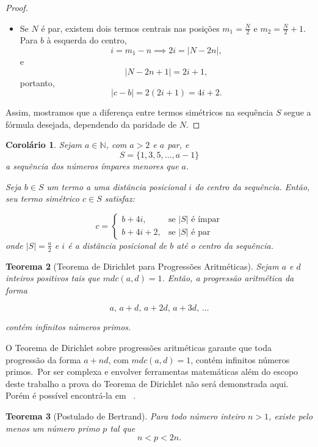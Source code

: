 \documentclass[a4paper,11pt]{article}
\newtheorem{theorem}{Teorema}[section]
\newtheorem{corollary}[theorem]{Corolário}
\theoremstyle{definition}
\theoremstyle{remark}
\begin{document}
\begin{otherlanguage}{brazil}
\begin{proof}
\begin{itemize}
			\item Se $N$ é par, existem dois termos centrais nas posições $m_1 = \frac{N}{2}$ e $m_2 = \frac{N}{2} + 1$. Para $b$ à esquerda do centro,
			\[
			i = m_1 - n \implies 2i = |N - 2n|,
			\]
			e
			\[
			|N - 2n + 1| = 2i + 1,
			\]
			portanto,
			\[
			|c - b| = 2(2i + 1) = 4i + 2.
			\]
		\end{itemize}
		
		Assim, mostramos que a diferença entre termos simétricos na sequência $S$ segue a fórmula desejada, dependendo da paridade de $N$.
		
	\end{proof}
	
	\begin{corollary} \label{coro:par_simetrico}
		Sejam $a \in \mathbb{N}$, com $a > 2$ e $a$ par, e
		\[
		S = \{1, 3, 5, \dotsc, a - 1\}
		\]
		a sequência dos números ímpares menores que $a$.
		
		Seja $b \in S$ um termo a uma distância posicional $i$ do centro da sequência. Então, seu termo simétrico $c \in S$ satisfaz:
		
		\[
		c =
		\begin{cases}
			b + 4i, & \text{se } |S| \text{ é ímpar} \\
			b + 4i + 2, & \text{se } |S| \text{ é par}
		\end{cases}
		\]
		onde $|S| = \frac{a}{2}$ e $i$ é a distância posicional de $b$ até o centro da sequência.
	\end{corollary}
	
	
	
	\begin{theorem}[Teorema de Dirichlet para Progressões Aritméticas] \label{teo:dirichlet}
		Sejam $a$ e $d$ inteiros positivos tais que $mdc(a, d) = 1$. Então, a progressão aritmética da forma
		
		\[
		a,\, a + d,\, a + 2d,\, a + 3d,\, \dots
		\]
		
		contém infinitos números primos.
	\end{theorem}
	
	O Teorema de Dirichlet sobre progressões aritméticas garante que toda progressão da forma $a + nd$, com $mdc(a, d) = 1$, contém infinitos números primos.~Por ser complexa e envolver ferramentas matemáticas além do escopo deste trabalho a prova do Teorema de Dirichlet não será demonstrada aqui. Porém é possível encontrá-la em ~\cite{apostol}.  
	
	\begin{theorem}[Postulado de Bertrand]\label{teo:postulado_de_bertrand}
		Para todo número inteiro \( n > 1 \), existe pelo menos um número primo \( p \) tal que
		\[
		n < p < 2n.
		\]
	\end{theorem}
	

\end{otherlanguage}
\end{document}
